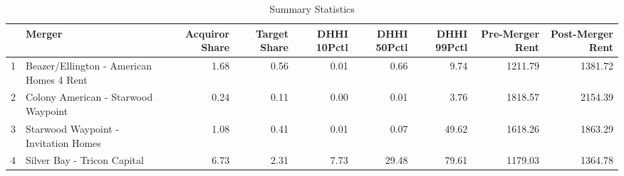 \begin{table}[ht]
\centering
\begin{tabular}{rlrrrrrrr}
  \hline
 & Merger & Acquiror Share & Target Share & DHHI 10Pctl & DHHI 50Pctl & DHHI 99Pctl & Pre-Merger Rent & Post-Merger Rent \\ 
  \hline
1 & Beazer/Ellington - American Homes 4 Rent & 1.68 & 0.56 & 0.01 & 0.66 & 9.74 & 1211.79 & 1381.72 \\ 
  2 & Colony American - Starwood Waypoint & 0.24 & 0.11 & 0.00 & 0.01 & 3.76 & 1818.57 & 2154.39 \\ 
  3 & Starwood Waypoint - Invitation Homes & 1.08 & 0.41 & 0.01 & 0.07 & 49.62 & 1618.26 & 1863.29 \\ 
  4 & Silver Bay - Tricon Capital & 6.73 & 2.31 & 7.73 & 29.48 & 79.61 & 1179.03 & 1364.78 \\ 
   \hline
\end{tabular}
\caption{Summary Statistics} 
\end{table}
